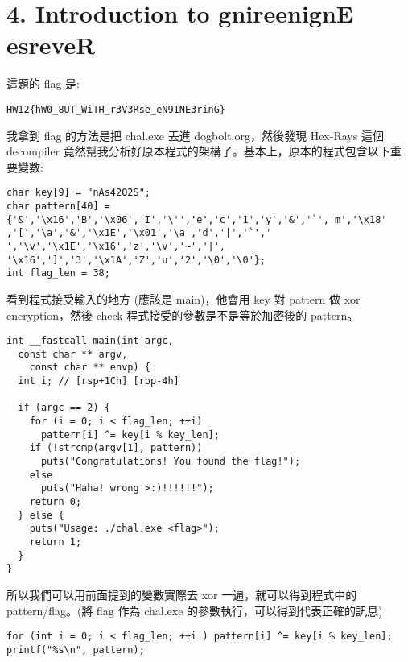 \documentclass[12pt]{article}
\begin{document}
\section*{4. Introduction to gnireenignE esreveR}
這題的 flag 是:

{\centering\verb|HW12{hW0_8UT_WiTH_r3V3Rse_eN91NE3rinG}|\par}

我拿到 flag 的方法是把 chal.exe 丟進 dogbolt.org，然後發現 Hex-Rays 這個 decompiler 竟然幫我分析好原本程式的架構了。基本上，原本的程式包含以下重要變數:
\begin{verbatim}
char key[9] = "nAs42O2S";
char pattern[40] = {'&','\x16','B','\x06','I','\'','e','c','1','y','&','`','m','\x18'
,'[','\a','&','\x1E','\x01','\a','d','|','`',' ','\v','\x1E','\x16','z','\v','~','|',
'\x16',']','3','\x1A','Z','u','2','\0','\0'}; 
int flag_len = 38; 
\end{verbatim}

看到程式接受輸入的地方 (應該是 main)，他會用 key 對 pattern 做 xor encryption，然後 check 程式接受的參數是不是等於加密後的 pattern。
\begin{verbatim}
int __fastcall main(int argc,
  const char ** argv,
    const char ** envp) {
  int i; // [rsp+1Ch] [rbp-4h]

  if (argc == 2) {
    for (i = 0; i < flag_len; ++i)
      pattern[i] ^= key[i % key_len];
    if (!strcmp(argv[1], pattern))
      puts("Congratulations! You found the flag!");
    else
      puts("Haha! wrong >:)!!!!!!");
    return 0;
  } else {
    puts("Usage: ./chal.exe <flag>");
    return 1;
  }
}
\end{verbatim}

所以我們可以用前面提到的變數實際去 xor 一遍，就可以得到程式中的 pattern/flag。(將 flag 作為 chal.exe 的參數執行，可以得到代表正確的訊息)
\begin{verbatim}
for (int i = 0; i < flag_len; ++i ) pattern[i] ^= key[i % key_len];
printf("%s\n", pattern);
\end{verbatim}
\end{document}
